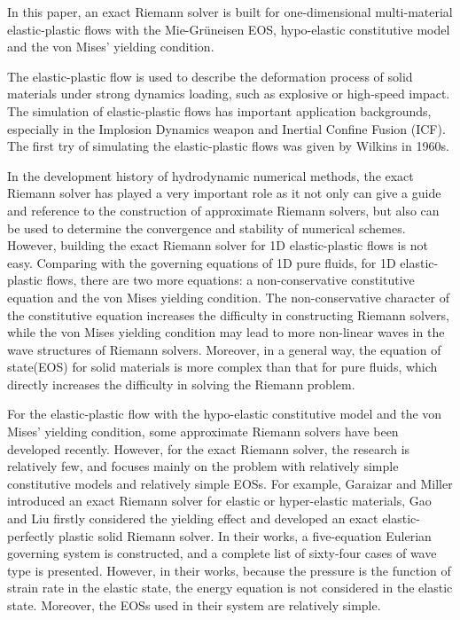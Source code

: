 \documentclass{article}
\numberwithin{equation}{section}
\numberwithin{table}{section}
\begin{document}
In this paper, an exact Riemann solver is built for one-dimensional  multi-material elastic-plastic flows with the Mie-Gr\"uneisen EOS, hypo-elastic constitutive model \cite{wilkins1963calculation} and  the von Mises' yielding condition.

The  elastic-plastic flow  is  used to describe the deformation process of solid materials under strong dynamics loading, such as explosive or high-speed impact. The simulation of elastic-plastic flows has important application backgrounds, especially in the Implosion Dynamics weapon and Inertial Confine Fusion (ICF). The first try of simulating the elastic-plastic flows was given by  Wilkins \cite{wilkins1963calculation} in 1960s.

In the development history of hydrodynamic numerical methods, the exact Riemann solver has played a very important role as it not only can give a guide and reference to the construction of approximate Riemann solvers, but also can be used to determine the convergence and stability of numerical schemes. However, building the exact Riemann solver for 1D elastic-plastic flows is not easy. Comparing with the governing equations of 1D pure fluids, for 1D elastic-plastic flows, there are two more equations: a non-conservative constitutive equation and the von Mises yielding condition.  The non-conservative character of the constitutive equation increases the difficulty in constructing  Riemann solvers, while the von Mises yielding condition may lead to more non-linear waves in the wave structures of Riemann solvers. Moreover, in a general way, the equation of state(EOS) for solid materials is more complex than that for pure fluids, which directly increases the difficulty in solving the Riemann problem.

For the elastic-plastic flow with the hypo-elastic constitutive model and  the von Mises' yielding condition,  some approximate Riemann solvers\cite{gavrilyuk2008modelling,cheng2015high,cheng2016harten,liumulti} have been developed recently. However, for the exact Riemann solver, the research is relatively few, and focuses mainly on the problem with relatively simple constitutive models and relatively simple EOSs.
For example, Garaizar \cite{garaizar1991solution} and Miller \cite{miller2004iterative} introduced  an exact Riemann solver for elastic or hyper-elastic materials, Gao and Liu \cite{gao20171d,gao2018complete} firstly considered the yielding effect and developed an exact elastic-perfectly plastic solid Riemann solver.  In their works, a five-equation Eulerian governing system is constructed, and a complete list of sixty-four cases of wave type is presented. {\color{blue} However, in their works, because the pressure is the function of strain rate in the elastic state, the energy equation is not considered in the elastic state. Moreover, the EOSs used in their system are relatively simple. }
\end{document}
